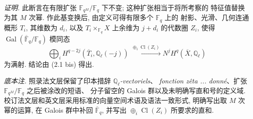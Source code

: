 \medskip
\noindent\emph{证明.}
此断言在有限扩张 $\mathbb F_{q^M}/\mathbb F_q$ 下不变; 这种扩张相当于将所考察的
特征值替换为其 $M$ 次幂. 作此基变换后, 由定义可得有限多个 $\mathbb F_q$ 上的
射影、光滑、几何连通概形 $T_i$, 其维数为 $d_i$, 以及
$T_i\times_{\mathbb F_q}X$ 上余维为 $j+d_i$ 的代数圈 $Z_i$, 使得
$\operatorname{Gal}(\overline{\mathbb F}_q/\mathbb F_q)$ 模同态
\begin{equation*}
\bigoplus_i H^{q-2j}(\overline T_i,\mathbb Q_\ell(-j))
\xrightarrow{\ \oplus_i\operatorname{Cl}(Z_i)\ }
N^jH^q(\overline X,\mathbb Q_\ell)
\end{equation*}
为满射. 结论由 (2.1 bis) 得出.

\medskip
\noindent\emph{底本注.}
照录法文层保留了印本措辞 \emph{$\mathbb Q_\ell$-vectoriels}、
\emph{fonction zêta ... donné}、扩张 $\mathbb F_{q^M}/\mathbb F_q$ 之后被涂改的短语、
分子留空的 Galois 群以及未明确写直和号的定义域.
校订法文层和英文层采用标准的向量空间术语及语法一致形式, 明确写出取 $M$ 次幂的运算,
在 Galois 群中补回 $\overline{\mathbb F}_q$, 并写出 $\oplus_i\operatorname{Cl}(Z_i)$
所要求的直和.
